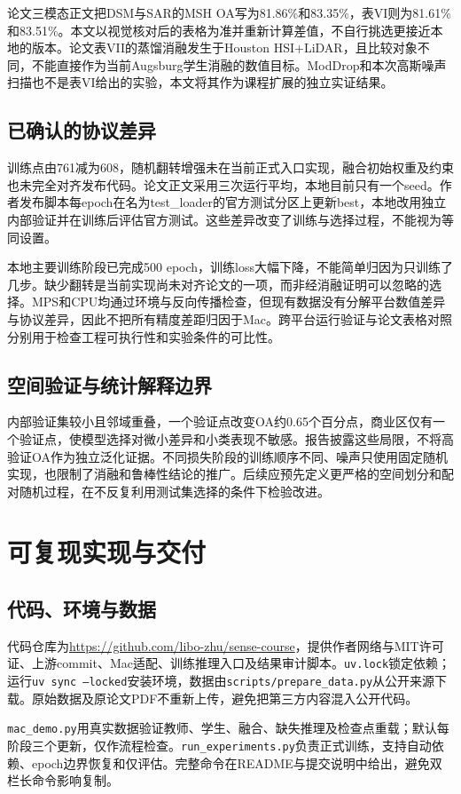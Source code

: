 \documentclass[conference,10pt]{IEEEtran}
\begin{document}
论文三模态正文把DSM与SAR的MSH OA写为81.86\%和83.35\%，表VI则为81.61\%和83.51\%。本文以视觉核对后的表格为准并重新计算差值，不自行挑选更接近本地的版本。论文表VII的蒸馏消融发生于Houston HSI+LiDAR，且比较对象不同，不能直接作为当前Augsburg学生消融的数值目标。ModDrop和本次高斯噪声扫描也不是表VI给出的实验，本文将其作为课程扩展的独立实证结果。

\subsection{已确认的协议差异}
训练点由761减为608，随机翻转增强未在当前正式入口实现，融合初始权重及约束也未完全对齐发布代码。论文正文采用三次运行平均，本地目前只有一个seed。作者发布脚本每epoch在名为test\_loader的官方测试分区上更新best，本地改用独立内部验证并在训练后评估官方测试。这些差异改变了训练与选择过程，不能视为等同设置。

本地主要训练阶段已完成500 epoch，训练loss大幅下降，不能简单归因为只训练了几步。缺少翻转是当前实现尚未对齐论文的一项，而非经消融证明可以忽略的选择。MPS和CPU均通过环境与反向传播检查，但现有数据没有分解平台数值差异与协议差异，因此不把所有精度差距归因于Mac。跨平台运行验证与论文表格对照分别用于检查工程可执行性和实验条件的可比性。

\subsection{空间验证与统计解释边界}
内部验证集较小且邻域重叠，一个验证点改变OA约0.65个百分点，商业区仅有一个验证点，使模型选择对微小差异和小类表现不敏感。报告披露这些局限，不将高验证OA作为独立泛化证据。不同损失阶段的训练顺序不同、噪声只使用固定随机实现，也限制了消融和鲁棒性结论的推广。后续应预先定义更严格的空间划分和配对随机过程，在不反复利用测试集选择的条件下检验改进。

\section{可复现实现与交付}
\subsection{代码、环境与数据}
代码仓库为\url{https://github.com/libo-zhu/sense-course}，提供作者网络与MIT许可证、上游commit、Mac适配、训练推理入口及结果审计脚本。\texttt{uv.lock}锁定依赖；运行\texttt{uv sync --locked}安装环境，数据由\texttt{scripts/prepare\_data.py}从公开来源下载。原始数据及原论文PDF不重新上传，避免把第三方内容混入公开代码。

\texttt{mac\_demo.py}用真实数据验证教师、学生、融合、缺失推理及检查点重载；默认每阶段三个更新，仅作流程检查。\texttt{run\_experiments.py}负责正式训练，支持自动依赖、epoch边界恢复和仅评估。完整命令在README与提交说明中给出，避免双栏长命令影响复制。
\end{document}
